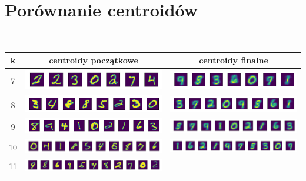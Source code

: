 \section*{Porównanie centroidów}
\phantom{.}\\
\begin{tabular}{ |c|c|c| }
    \hline
        k & centroidy początkowe & centroidy finalne \\
    \hline
        7 & 
        \includegraphics[width=0.45\linewidth]{../results/7-clusters/centroids_start.png} &
        \includegraphics[width=0.45\linewidth]{../results/7-clusters/centroids_end.png} \\
    \hline
        8 & 
        \includegraphics[width=0.45\linewidth]{../results/8-clusters/centroids_start.png} &
        \includegraphics[width=0.45\linewidth]{../results/8-clusters/centroids_end.png} \\
    \hline
        9 & 
        \includegraphics[width=0.45\linewidth]{../results/9-clusters/centroids_start.png} &
        \includegraphics[width=0.45\linewidth]{../results/9-clusters/centroids_end.png} \\
    \hline
        10 & 
        \includegraphics[width=0.45\linewidth]{../results/10-clusters/centroids_start.png} &
        \includegraphics[width=0.45\linewidth]{../results/10-clusters/centroids_end.png} \\
    \hline
        11 & 
        \includegraphics[width=0.45\linewidth]{../results/11-clusters/centroids_start.png} &

\end{tabular}
